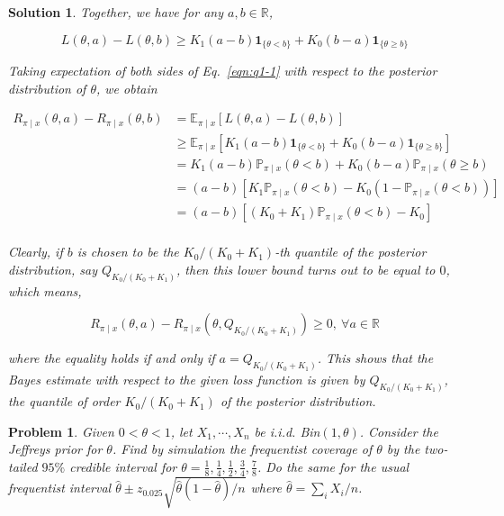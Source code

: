\documentclass[12pt]{article}
\theoremstyle{problemstyle}
\newtheorem{pbm}{Problem}
\newtheorem*{solution*}{Solution}
\newenvironment{problem}{
\begin{tcolorbox}[colback=green!10!white,colframe=black!75!black, parbox = false]\begin{pbm} }{\end{pbm}\end{tcolorbox} }
\newcommand{\prob}{\mathbb{P}}
\newcommand{\E}{\mathbb{E}}
\newcommand{\R}{\mathbb{R}}
\newcommand{\ind}[1]{\mathbf{1}_{ \{#1\} }}
\begin{document}
\begin{solution*}
    Together, we have for any $a, b \in \R$, 

    \begin{equation}
        L(\theta, a) - L(\theta, b) \geq K_1(a - b) \ind{\theta < b} + K_0 (b - a) \ind{\theta \geq b}
        \label{eqn:q1-1}
    \end{equation}

    Taking expectation of both sides of Eq.~\eqref{eqn:q1-1} with respect to the posterior distribution of $\theta$, we obtain 

    \begin{align*}
        R_{\pi \mid x}(\theta, a) - R_{\pi \mid x}(\theta, b)
        & = \E_{\pi \mid x}\left[ L(\theta, a) - L(\theta, b) \right]\\
        & \geq \E_{\pi \mid x} \left[ K_1(a - b) \ind{\theta < b} + K_0 (b - a) \ind{\theta \geq b} \right]\\
        & = K_1(a - b)\prob_{\pi \mid x}(\theta < b) + K_0 (b - a)\prob_{\pi \mid x}(\theta \geq b)\\
        & = (a - b) \left[ K_1 \prob_{\pi \mid x}(\theta < b) - K_0 (1 - \prob_{\pi \mid x}(\theta < b)) \right]\\
        & = (a - b) \left[ (K_0 + K_1)\prob_{\pi \mid x}(\theta < b) - K_0 \right]\\
    \end{align*}

    Clearly, if $b$ is chosen to be the $K_0 / (K_0 + K_1)$-th quantile of the posterior distribution, say $Q_{K_0/(K_0 + K_1)}$, then this lower bound turns out to be equal to $0$, which means, 

    $$
    R_{\pi \mid x}(\theta, a) - R_{\pi \mid x}(\theta, Q_{K_0/(K_0 + K_1)}) \geq 0, \ \forall a \in \R
    $$

    where the equality holds if and only if $a = Q_{K_0/(K_0 + K_1)}$. This shows that the Bayes estimate with respect to the given loss function is given by $Q_{K_0/(K_0 + K_1)}$, the quantile of order $K_0/(K_0 + K_1)$ of the posterior distribution.
\end{solution*}
\pagebreak

\begin{problem}
Given $0 < \theta < 1$, let $X_1,\cdots, X_n$ be i.i.d. Bin$(1,\theta)$. Consider the Jeffreys prior for $\theta$. Find by simulation the frequentist coverage of $\theta$ by the two-tailed $95\%$ credible interval for $\theta = \frac{1}{8},\frac{1}{4},\frac{1}{2},\frac{3}{4},\frac{7}{8}$. Do the same for the usual frequentist interval $\hat{\theta}\pm z_{0.025}\sqrt{\hat{\theta}(1-\hat{\theta})/n}$ where $\hat{\theta}=\sum_i X_i/n$.
\end{problem}
\end{document}
